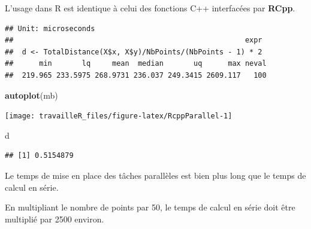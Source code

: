 \documentclass[
  12pt,
  french,
  a4paper,
  extrafontsizes,onecolumn,openright
  ]{memoir}
\newenvironment{Shaded}{\begin{snugshade}}{\end{snugshade}}
\newcommand{\DecValTok}[1]{\textcolor[rgb]{0.00,0.00,0.81}{#1}}
\newcommand{\FunctionTok}[1]{\textcolor[rgb]{0.13,0.29,0.53}{\textbf{#1}}}
\newcommand{\NormalTok}[1]{#1}
\newcommand{\OtherTok}[1]{\textcolor[rgb]{0.56,0.35,0.01}{#1}}
\newcommand{\SpecialCharTok}[1]{\textcolor[rgb]{0.81,0.36,0.00}{\textbf{#1}}}
\newlength{\rf}
\begin{document}
\normalsize

L'usage dans R est identique à celui des fonctions C++ interfacées par \textbf{RCpp}.

\scriptsize

\begin{Shaded}
\end{Shaded}

\begin{verbatim}
## Unit: microseconds
##                                                      expr
##  d <- TotalDistance(X$x, X$y)/NbPoints/(NbPoints - 1) * 2
##      min       lq     mean  median       uq      max neval
##  219.965 233.5975 268.9731 236.037 249.3415 2609.117   100
\end{verbatim}

\begin{Shaded}
\begin{Highlighting}[]
\FunctionTok{autoplot}\NormalTok{(mb)}
\end{Highlighting}
\end{Shaded}

\begin{center}\texttt{[image: travailleR\_files/figure-latex/RcppParallel-1]} \end{center}

\begin{Shaded}
\begin{Highlighting}[]
\NormalTok{d}
\end{Highlighting}
\end{Shaded}

\begin{verbatim}
## [1] 0.5154879
\end{verbatim}

\normalsize

Le temps de mise en place des tâches parallèles est bien plus long que le temps de calcul en série.

En multipliant le nombre de points par 50, le temps de calcul en série doit être multiplié par 2500 environ.
\end{document}

